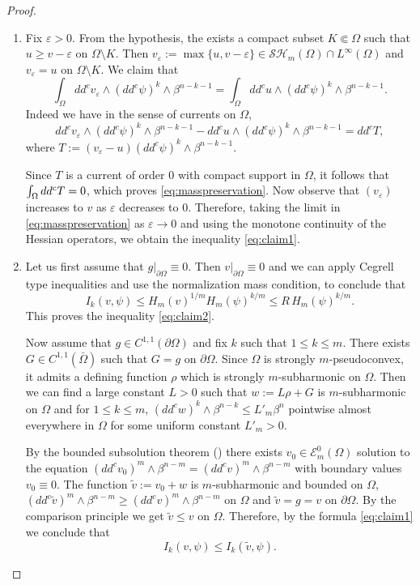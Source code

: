 \skpt
\begin{proof}
\begin{enumerate}
\item
Fix $\varepsilon > 0$. From the hypothesis, the exists a compact subset $K \Subset \Omega$ such that $ u \geq v - \varepsilon$ on $\Omega \setminus K$. Then $v_\varepsilon := \max \{u,v-\varepsilon\} \in \mathcal{SH}_m (\Omega) \cap L^{\infty} (\Omega)$ and $v_\varepsilon = u$ on $\Omega \setminus K$.
We claim that
\begin{equation} \label{eq:masspreservation}
\int_{\Omega} dd^c v_\varepsilon \wedge (dd^c \psi)^{k} \wedge\beta^{n-k-1} = \int_{\Omega} dd^c u \wedge (dd^c \psi)^k \wedge\beta^{n-k-1}.
\end{equation}
Indeed we have in the sense of currents on $\Omega$,
\[
dd^c v_\varepsilon \wedge (dd^c \psi)^{k} \wedge\beta^{n-k-1} - dd^c u \wedge (dd^c \psi)^k \wedge\beta^{n-k-1} = dd^c T,
\]
where $T := (v_\varepsilon - u) (dd^c \psi)^k \wedge\beta^{n-k-1}$.

Since $T$ is a current of order $0$ with compact support in $\Omega$, it follows that $\int_\Omega dd^c T =\nobreak 0$, which proves \eqref{eq:masspreservation}.
Now observe that $(v_\varepsilon)$ increases to $v$ as $\varepsilon$ decreases to $0$. Therefore, taking the limit in \eqref{eq:masspreservation} as $\varepsilon \to 0$ and using the monotone continuity of the Hessian operators, we obtain the inequality \eqref{eq:claim1}.

\item
Let us first assume that $g|_{\partial \Omega} \equiv 0$. Then $v|_{\partial \Omega} \equiv 0$ and we can apply Cegrell type inequalities \cite[Lem.\,2.8]{BZ20} and use the normalization mass condition, to conclude that
\[
I_k(v,\psi) \leq H_m (v)^{1\slash m} H_m (\psi)^{k \slash m}
\leq  R \, H_m (\psi)^{k \slash m}.
\]
This proves the inequality \eqref{eq:claim2}.

Now assume that $g \in C^{1,1} (\partial \Omega)$ and fix $k$ such that $1 \leq k \leq m$.
There exists $G \in C^{1,1} (\bar{\Omega})$ such that $G = g$ on $\partial \Omega$. Since $\Omega$ is strongly $m$-pseudoconvex, it admits a defining function $\rho$ which is strongly $m$-subharmonic on $\Omega$. Then we can find a large constant $L > 0$ such that $w := L \rho + G$ is $m$-subharmonic on $\Omega$ and for $1 \leq k \leq m$, $(dd^c w)^k \wedge \beta^{n-k} \leq L'_m \beta^n$ pointwise almost everywhere in $\Omega$ for some uniform constant $L'_m > 0$.

By the bounded subsolution theorem (\cite{N13}) there exists $v_0 \in \mathcal{E}^0_m (\Omega)$ solution to the equation $(dd^c v_0)^m \wedge \beta^{n-m} = (dd^c v)^m \wedge \beta^{n-m}$ with boundary values $v_0 \equiv 0$.
The function $\tilde v := v_0 + w$ is $m$-subharmonic and bounded on $\Omega$, $(dd^c \tilde v)^m \wedge \beta^{n-m} \geq (dd^c v)^m \wedge \beta^{n-m} $ on $\Omega$ and $ \tilde v = g = v$ on $\partial \Omega$. By the comparison principle we get $\tilde v \leq v$ on $\Omega$.
Therefore, by the formula \eqref{eq:claim1} we conclude that
\[
I_k (v,\psi) \leq I_k (\tilde v,\psi).
\]


\end{enumerate}
\end{proof}
